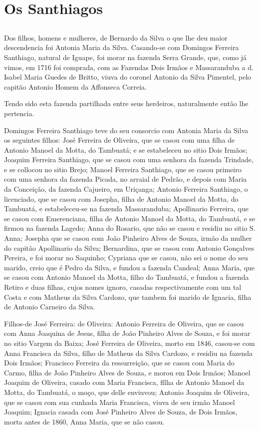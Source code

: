 \chapter{Os Santhiagos}
\section*{}
Dos filhos, homens e mulheres, de Bernardo da Silva o que lhe deu maior descendencia foi Antonia Maria da Silva. Casando-se com
Domingos Ferreira Santhiago, natural de Iguape, foi morar na fazenda Serra Grande, que, como já vimos, em 1716 foi comprada, com as Fazendas Dois Irmãos e Massaranduba a d. Isabel Maria Guedes de Britto, viuva do coronel Antonio da Silva Pimentel, pelo capitão Antonio Homem da Affonseca Correia.

Tendo sido esta fazenda partilhada entre seus herdeiros, naturalmente então lhe pertencia.

Domingos Ferreira Santhiago teve do seu consorcio com Antonia Maria da Silva os seguintes filhos: José Ferreira de Oliveira, que se casou com uma filha de Antonio Manoel da Motta, do Tambuatá; e se estabeleceu no sitio Dois Irmãos; Joaquim Ferreira Santhiago, que se casou com uma senhora da fazenda Trindade, e se collocou no sitio Brejo; Manoel Ferreira Santhiago, que se casou primeiro com uma senhora da fazenda Picada, no arraial de Pedrão, e depois com Maria da Conceição, da fazenda Cajueiro, em Uriçanga; Antonio Ferreira Santhiago, o licenciado, que se casou com Josepha, filha de Antonio Manoel da Motta, do Tambuatá, e estabeleceu-se na fazenda Massaranduba; Apollinario Ferreira, que se casou com Emerenciana, filha de Antonio Manoel da Motta, do Tambuatá, e se firmou na fazenda Lagedo; Anna do Rosario, que não se casou e residiu no sitio S. Anna; Josepha que se casou com João Pinheiro Alves de Souza, irmão da mulher do capitão Apollinario da Silva; Bernardina, que se casou com Antonio Gonçalves Pereira, e foi morar no Saquinho; Cypriana que se casou, não sei o nome do seu marido, creio que é Pedro da Silva, e fundou a fazenda Candeal; Anna Maria, que se casou com Antonio Manoel da Motta, filho do Tambuatá, e fundou a fazenda Retiro e duas filhas, cujos nomes ignoro, casadas respectivamente com um tal Costa e com Matheus da Silva Cardozo, que tambem foi marido de Ignacia, filha de Antonio Carneiro da Silva.


Filhos-de José Ferreira: de Oliveira: Antonio Ferreira de Oliveira, que se casou com Anna Joaquina de Jesus, filha de João Pinheiro Alves de Souza, e foi morar no sitio Vargem da Baixa; José Ferreira de Oliveira\label{jfoliveira}, morto em 1846, casou-se com Anna Francisca da Silva, filho de Matheus da Silva Cardozo, e residiu na fazenda Dois Irmãos; Francisco Ferreira da ressurreição, que se casou com Maria do Carmo, filha de João Pinheiro Alves de Souza, e morou em Dois Irmãos; Manoel Joaquim de Oliveira, casado com Maria Francisca, fllha de Antonio Manoel da Motta, do Tambuatá, o moço, que delle enviuvou; Antonio Joaquim de Oliveira, que se casou com sua cunhada Maria Francisca, viuva de seu irmão Manoel Joaquim; Ignacia casada com José Pinheiro Alves\label{jpalves} de Souza, de Dois Irmãos, morta antes de 1860, Anna Maria, que se não casou. 

